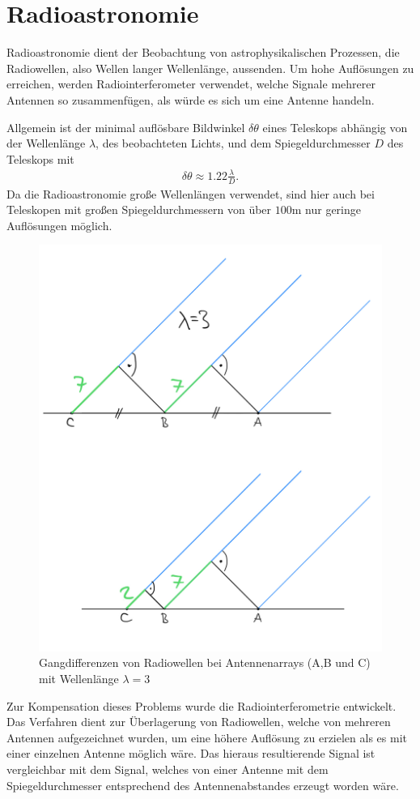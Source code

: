\section{Radioastronomie}

Radioastronomie dient der Beobachtung von astrophysikalischen Prozessen, die Radiowellen, also Wellen langer Wellenlänge, aussenden. Um hohe Auflösungen zu erreichen, werden Radiointerferometer verwendet, welche Signale mehrerer Antennen so zusammenfügen, als würde es sich um eine Antenne handeln.

Allgemein ist der minimal auflösbare Bildwinkel $\delta\theta$ eines Teleskops abhängig von der Wellenlänge $\lambda$, des beobachteten Lichts, und dem Spiegeldurchmesser $D$ des Teleskops mit \begin{eqnarray}
\delta\theta\approx1.22\frac{\lambda}{D}.
\end{eqnarray}
Da die Radioastronomie große Wellenlängen verwendet, sind hier auch bei Teleskopen mit großen Spiegeldurchmessern von über $100\text{m}$ nur geringe Auflösungen möglich.

\begin{figure}[htb]
\centering
\includegraphics[width=.4\textwidth]{k4.2/baselineunterschied.png}
\caption{Gangdifferenzen von Radiowellen bei Antennenarrays (A,B und C) mit Wellenlänge $\lambda = 3$}
\label{bild-baselineunterschied}
\end{figure}

Zur Kompensation dieses Problems wurde die Radiointerferometrie entwickelt.
Das Verfahren dient zur Überlagerung von Radiowellen, welche von mehreren Antennen aufgezeichnet wurden, um eine höhere Auflösung zu erzielen als es mit einer einzelnen Antenne möglich wäre.
Das hieraus resultierende Signal ist vergleichbar mit dem Signal, welches von einer Antenne mit dem Spiegeldurchmesser entsprechend des Antennenabstandes erzeugt worden wäre.


